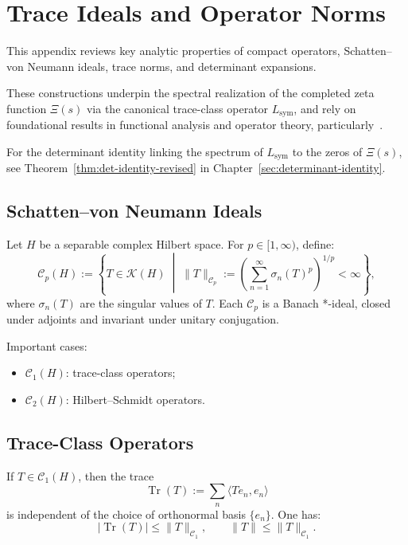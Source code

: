 \section{Trace Ideals and Operator Norms}
\label{app:trace_ideals_review}

This appendix reviews key analytic properties of compact operators, Schatten–von Neumann ideals, trace norms, and determinant expansions.

These constructions underpin the spectral realization of the completed zeta function \( \Xi(s) \) via the canonical trace-class operator \( L_{\mathrm{sym}} \), and rely on foundational results in functional analysis and operator theory, particularly~\cite{Simon2005TraceIdeals, ReedSimon1980I, ReedSimon1975II}.

For the determinant identity linking the spectrum of \( L_{\mathrm{sym}} \) to the zeros of \( \Xi(s) \), see Theorem~\ref{thm:det-identity-revised} in Chapter~\ref{sec:determinant-identity}.

\subsection*{Schatten–von Neumann Ideals}

Let \( H \) be a separable complex Hilbert space. For \( p \in [1, \infty) \), define:
\[
\mathcal{C}_p(H) := \left\{ T \in \mathcal{K}(H) \;\middle|\; \|T\|_{\mathcal{C}_p} := \left( \sum_{n=1}^\infty \sigma_n(T)^p \right)^{1/p} < \infty \right\},
\]
where \( \sigma_n(T) \) are the singular values of \( T \). Each \( \mathcal{C}_p \) is a Banach *-ideal, closed under adjoints and invariant under unitary conjugation.

\medskip
Important cases:
\begin{itemize}
  \item \( \mathcal{C}_1(H) \): trace-class operators;
  \item \( \mathcal{C}_2(H) \): Hilbert–Schmidt operators.
\end{itemize}

\subsection*{Trace-Class Operators}

If \( T \in \mathcal{C}_1(H) \), then the trace
\[
\operatorname{Tr}(T) := \sum_n \langle T e_n, e_n \rangle
\]
is independent of the choice of orthonormal basis \( \{ e_n \} \). One has:
\[
|\operatorname{Tr}(T)| \le \|T\|_{\mathcal{C}_1}, \qquad \|T\| \le \|T\|_{\mathcal{C}_1}.
\]

